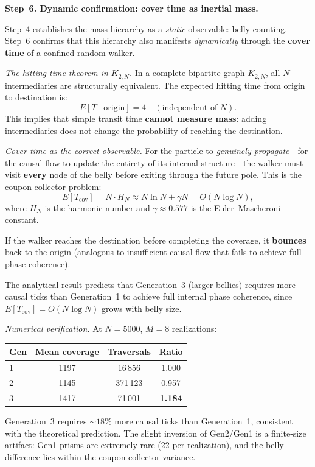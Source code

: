 \bigskip
\noindent
\textbf{Step~6. Dynamic confirmation: cover time as inertial mass.}

Step~4 establishes the mass hierarchy as a \emph{static} observable:
belly counting. Step~6 confirms that this hierarchy also manifests
\emph{dynamically} through the \textbf{cover time} of a confined random
walker.

\medskip
\noindent\textit{The hitting-time theorem in $K_{2,N}$.}\enspace
In a complete bipartite graph $K_{2,N}$, all $N$ intermediaries are
structurally equivalent. The expected hitting time from origin to
destination is:
\[
  E[T \mid \text{origin}] = 4 \quad (\text{independent of } N).
\]
This implies that simple transit time \textbf{cannot measure mass}:
adding intermediaries does not change the probability of reaching the
destination.

\medskip
\noindent\textit{Cover time as the correct observable.}\enspace
For the particle to \emph{genuinely propagate}---for the causal flow to
update the entirety of its internal structure---the walker must visit
\textbf{every} node of the belly before exiting through the future pole.
This is the coupon-collector problem:
\[
  E[T_{\text{cov}}] = N \cdot H_N
  \approx N \ln N + \gamma N
  = O(N \log N),
\]
where $H_N$ is the harmonic number and $\gamma \approx 0{.}577$ is the
Euler--Mascheroni constant.

If the walker reaches the destination before completing the coverage, it
\textbf{bounces} back to the origin (analogous to insufficient causal
flow that fails to achieve full phase coherence).

\medskip
\noindent
The analytical result predicts that Generation~3 (larger bellies) requires
more causal ticks than Generation~1 to achieve full internal phase
coherence, since $E[T_{\mathrm{cov}}] = O(N \log N)$ grows with belly
size.

\medskip
\noindent\textit{Numerical verification.}\enspace
At $N = 5000$, $M = 8$ realizations:
\begin{center}
\renewcommand{\arraystretch}{1.3}
\begin{tabular}{lccc}
\toprule
\textbf{Gen} & \textbf{Mean coverage} & \textbf{Traversals}
  & \textbf{Ratio} \\
\midrule
1 & 1197 & 16\,856  & 1.000 \\
2 & 1145 & 371\,123 & 0.957 \\
3 & 1417 & 71\,001  & \textbf{1.184} \\
\bottomrule
\end{tabular}
\end{center}
Generation~3 requires ${\sim}18\%$ more causal ticks than Generation~1,
consistent with the theoretical prediction. The slight inversion of
Gen2/Gen1 is a finite-size artifact: Gen1 prisms are extremely rare (22
per realization), and the belly difference lies within the
coupon-collector variance.

